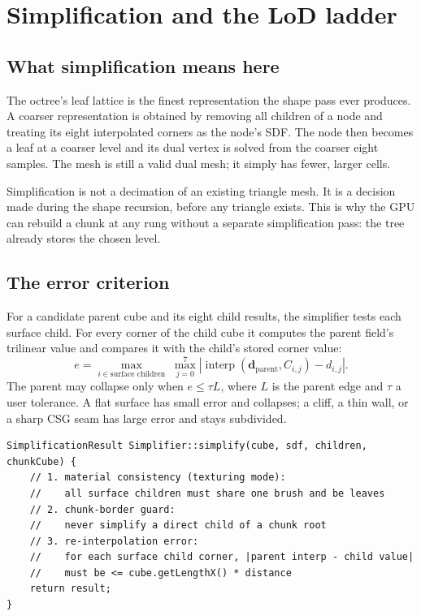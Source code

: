 \section{Simplification and the LoD ladder}
\label{sec:lod}

\subsection{What simplification means here}

The octree's leaf lattice is the finest representation the shape pass ever
produces.  A coarser representation is obtained by removing all children of
a node and treating its eight interpolated corners as the node's SDF.  The
node then becomes a leaf at a coarser level and its dual vertex is solved
from the coarser eight samples.  The mesh is still a valid dual mesh; it
simply has fewer, larger cells.

Simplification is not a decimation of an existing triangle mesh.  It is a
decision made during the shape recursion, before any triangle exists.  This
is why the GPU can rebuild a chunk at any rung without a separate
simplification pass: the tree already stores the chosen level.

\subsection{The error criterion}

For a candidate parent cube and its eight child results, the simplifier
tests each surface child.  For every corner of the child cube it computes
the parent field's trilinear value and compares it with the child's stored
corner value:
\begin{equation}
  e = \max_{i\in\text{surface children}}\;
      \max_{j=0}^{7}
      \left| \operatorname{interp}(\mathbf{d}_{\text{parent}},
      C_{i,j}) - d_{i,j} \right|.
\end{equation}
The parent may collapse only when $e \le \tau L$, where $L$ is the parent
edge and $\tau$ a user tolerance.  A flat surface has small error and
collapses; a cliff, a thin wall, or a sharp CSG seam has large error and
stays subdivided.

\begin{lstlisting}[caption={The simplifier's core checks (abridged).},label={lst:simplify}]
SimplificationResult Simplifier::simplify(cube, sdf, children, chunkCube) {
    // 1. material consistency (texturing mode):
    //    all surface children must share one brush and be leaves
    // 2. chunk-border guard:
    //    never simplify a direct child of a chunk root
    // 3. re-interpolation error:
    //    for each surface child corner, |parent interp - child value|
    //    must be <= cube.getLengthX() * distance
    return result;
}
\end{lstlisting}

